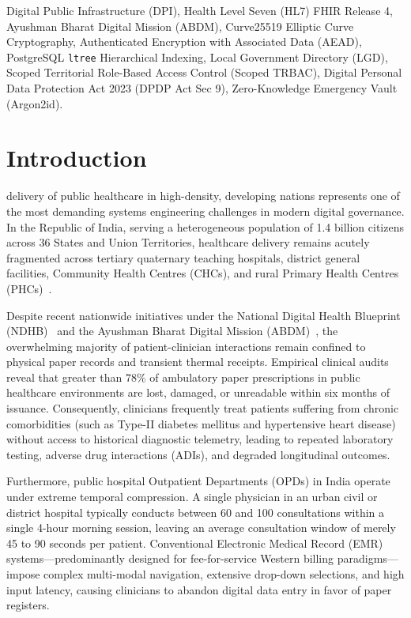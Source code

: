 \documentclass[journal,twocolumn]{IEEEtran}
\begin{document}
\begin{IEEEkeywords}
Digital Public Infrastructure (DPI), Health Level Seven (HL7) FHIR Release 4, Ayushman Bharat Digital Mission (ABDM), Curve25519 Elliptic Curve Cryptography, Authenticated Encryption with Associated Data (AEAD), PostgreSQL \texttt{ltree} Hierarchical Indexing, Local Government Directory (LGD), Scoped Territorial Role-Based Access Control (Scoped TRBAC), Digital Personal Data Protection Act 2023 (DPDP Act Sec 9), Zero-Knowledge Emergency Vault (Argon2id).
\end{IEEEkeywords}

\IEEEpeerreviewmaketitle

\section{Introduction}
 delivery of public healthcare in high-density, developing nations represents one of the most demanding systems engineering challenges in modern digital governance. In the Republic of India, serving a heterogeneous population of 1.4 billion citizens across 36 States and Union Territories, healthcare delivery remains acutely fragmented across tertiary quaternary teaching hospitals, district general facilities, Community Health Centres (CHCs), and rural Primary Health Centres (PHCs)~\cite{patel_opd_congestion}. 

Despite recent nationwide initiatives under the National Digital Health Blueprint (NDHB)~\cite{mohfw_ndhb_2019} and the Ayushman Bharat Digital Mission (ABDM)~\cite{nha_abdm_2023}, the overwhelming majority of patient-clinician interactions remain confined to physical paper records and transient thermal receipts. Empirical clinical audits reveal that greater than $78\%$ of ambulatory paper prescriptions in public healthcare environments are lost, damaged, or unreadable within six months of issuance. Consequently, clinicians frequently treat patients suffering from chronic comorbidities (such as Type-II diabetes mellitus and hypertensive heart disease) without access to historical diagnostic telemetry, leading to repeated laboratory testing, adverse drug interactions (ADIs), and degraded longitudinal outcomes.

Furthermore, public hospital Outpatient Departments (OPDs) in India operate under extreme temporal compression. A single physician in an urban civil or district hospital typically conducts between 60 and 100 consultations within a single 4-hour morning session, leaving an average consultation window of merely 45 to 90 seconds per patient. Conventional Electronic Medical Record (EMR) systems—predominantly designed for fee-for-service Western billing paradigms—impose complex multi-modal navigation, extensive drop-down selections, and high input latency, causing clinicians to abandon digital data entry in favor of paper registers.
\end{document}
